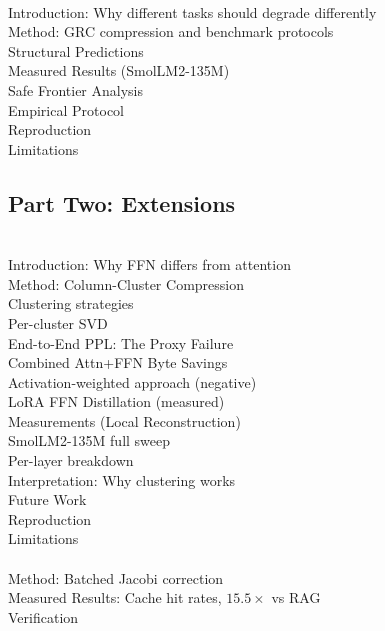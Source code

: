 \documentclass[11pt]{article}
\begin{document}
\vspace{6pt}
\\
\quad Introduction: Why different tasks should degrade differently\\
\quad Method: GRC compression and benchmark protocols\\
\quad Structural Predictions\\
\quad Measured Results (SmolLM2-135M)\\
\quad \quad Safe Frontier Analysis\\
\quad Empirical Protocol\\
\quad Reproduction\\
\quad Limitations\\

\subsection*{Part Two: Extensions}

\\
\quad Introduction: Why FFN differs from attention\\
\quad Method: Column-Cluster Compression\\
\quad \quad Clustering strategies\\
\quad \quad Per-cluster SVD\\
\quad End-to-End PPL: The Proxy Failure\\
\quad Combined Attn+FFN Byte Savings\\
\quad \quad Activation-weighted approach (negative)\\
\quad \quad LoRA FFN Distillation (measured)\\
\quad Measurements (Local Reconstruction)\\
\quad \quad SmolLM2-135M full sweep\\
\quad \quad Per-layer breakdown\\
\quad Interpretation: Why clustering works\\
\quad Future Work\\
\quad Reproduction\\
\quad Limitations\\

\vspace{6pt}
\\
\quad Method: Batched Jacobi correction\\
\quad Measured Results: Cache hit rates, $15.5\times$ vs RAG\\
\quad Verification\\
\end{document}
